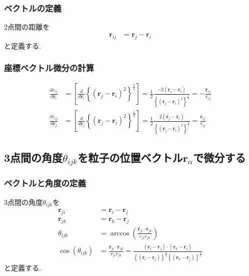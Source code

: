 \subsubsection{ベクトルの定義}
2点間の距離を
\begin{align}
   \bm{r}_{ij}
&= \bm{r}_{j} - \bm{r}_{i}
\end{align}
と定義する.

\subsubsection{座標ベクトル微分の計算}
\begin{align}
\frac{d r_{ij}}{d \bm{r}_{i}}
&=
\left[
   \frac{d}{d \bm{r}_{i}}
   \left\{ (\bm{r}_{j} - \bm{r}_{i} )^{2} \right\}^{\frac{1}{2}}
\right]
=
\frac{1}{2}
\frac{ -2 (\bm{r}_{j} - \bm{r}_{i}) }
     { \left\{ ( \bm{r}_{j} - \bm{r}_{i} )^{2} \right\}^{\frac{1}{2}} }
=
-
\frac{\bm{r}_{ij}}{r_{ij}}
\label{Eq:dr_ij-dr_i}
\\
\frac{d r_{ij}}{d \bm{r}_{j}}
&=
\left[
   \frac{d}{d \bm{r}_{j}}
   \left\{ (\bm{r}_{j} - \bm{r}_{i} )^{2} \right\}^{\frac{1}{2}}
\right]
=
\frac{1}{2}
\frac{ 2 (\bm{r}_{j} - \bm{r}_{i}) }
     { \left\{ ( \bm{r}_{j} - \bm{r}_{i} )^{2} \right\}^{\frac{1}{2}} }
=
\frac{\bm{r}_{ij}}{r_{ij}}
\label{Eq:dr_ij-dr_j}
\end{align}

\subsection{3点間の角度$\theta_{ijk}$を粒子の位置ベクトル$\bm{r}_{\alpha}$で微分する}
\subsubsection{ベクトルと角度の定義}
3点間の角度$\theta_{ijk}$を
\begin{align}
   \bm{r}_{ji}
&= \bm{r}_{i} - \bm{r}_{j}
\\
   \bm{r}_{jk}
&= \bm{r}_{k} - \bm{r}_{j}
\\
   \theta_{ijk}
&= \arccos \left( \frac{\bm{r}_{ji} \cdot \bm{r}_{jk}}{r_{ji} r_{jk}} \right)
\\
   \cos(\theta_{ijk})
&= \frac{\bm{r}_{ji} \cdot \bm{r}_{jk}}{r_{ji} r_{jk}}
 = \frac{(\bm{r}_{i} - \bm{r}_{j}) \cdot (\bm{r}_{k} - \bm{r}_{j})}
        {\left\{(\bm{r}_{i} - \bm{r}_{j})\right\}^{\frac{1}{2}}
         \left\{(\bm{r}_{k} - \bm{r}_{j})\right\}^{\frac{1}{2}}}
\end{align}
と定義する.

